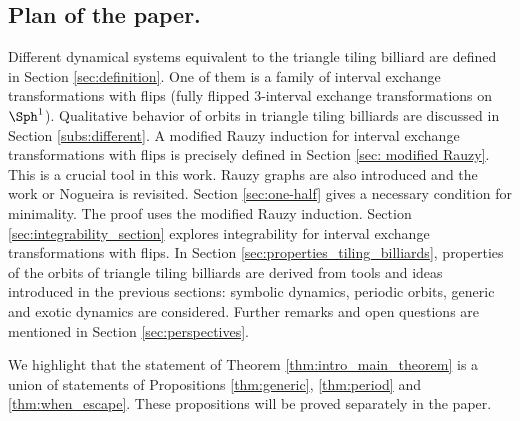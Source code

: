 \documentclass[12pt]{article}
\theoremstyle{definition}
\begin{document}
\subsection{Plan of the paper.}
Different dynamical systems equivalent to the triangle tiling billiard are defined in Section \ref{sec:definition}. One of them  is a family of  interval exchange transformations with flips (fully flipped  $3$-interval exchange transformations on $\Sph^1$).  Qualitative behavior of orbits in triangle tiling billiards are discussed in Section \ref{subs:different}.  A modified Rauzy induction for interval exchange transformations with flips is precisely defined in Section \ref{sec: modified Rauzy}. This is a crucial tool in this work. Rauzy graphs are also introduced and the work or Nogueira is revisited. Section \ref{sec:one-half} gives a necessary condition for minimality. The proof uses the modified Rauzy induction. Section \ref{sec:integrability_section} explores integrability for interval exchange transformations with flips. In Section \ref{sec:properties_tiling_billiards}, properties of the orbits of triangle tiling billiards are derived from tools and ideas introduced in the previous sections: symbolic dynamics, periodic orbits, generic and exotic dynamics are considered. Further remarks and open questions are mentioned in Section \ref{sec:perspectives}.

We highlight that the statement of Theorem \ref{thm:intro_main_theorem} is a union of statements of Propositions \ref{thm:generic}, \ref{thm:period} and \ref{thm:when_escape}. These propositions will be proved separately in the paper.
\end{document}
